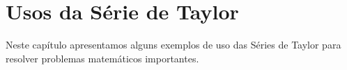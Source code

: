 \chapter{Usos da Série de Taylor}
\label{cap:usos_taylor}

\minitoc

Neste capítulo apresentamos alguns exemplos de uso das Séries de Taylor para
resolver problemas matemáticos importantes.








